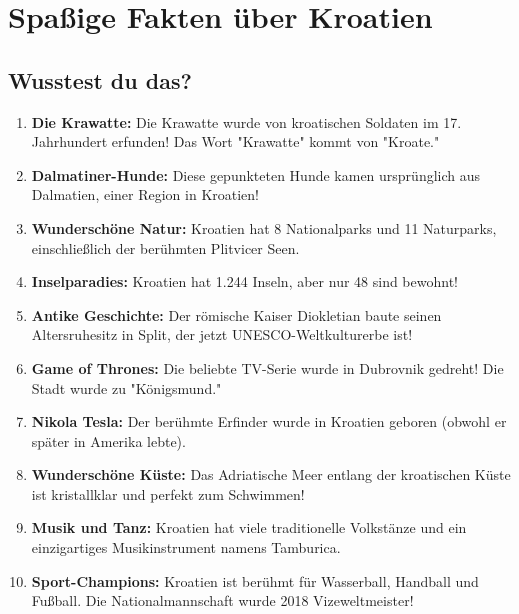 \section{Spaßige Fakten über Kroatien}

\begin{culture}
\subsection*{Wusstest du das?}

\begin{enumerate}
    \item \textbf{Die Krawatte:} Die Krawatte wurde von kroatischen Soldaten im 17. Jahrhundert erfunden! Das Wort "Krawatte" kommt von "Kroate."
    
    \item \textbf{Dalmatiner-Hunde:} Diese gepunkteten Hunde kamen ursprünglich aus Dalmatien, einer Region in Kroatien!
    
    \item \textbf{Wunderschöne Natur:} Kroatien hat 8 Nationalparks und 11 Naturparks, einschließlich der berühmten Plitvicer Seen.
    
    \item \textbf{Inselparadies:} Kroatien hat 1.244 Inseln, aber nur 48 sind bewohnt!
    
    \item \textbf{Antike Geschichte:} Der römische Kaiser Diokletian baute seinen Altersruhesitz in Split, der jetzt UNESCO-Weltkulturerbe ist!
    
    \item \textbf{Game of Thrones:} Die beliebte TV-Serie wurde in Dubrovnik gedreht! Die Stadt wurde zu "Königsmund."
    
    \item \textbf{Nikola Tesla:} Der berühmte Erfinder wurde in Kroatien geboren (obwohl er später in Amerika lebte).
    
    \item \textbf{Wunderschöne Küste:} Das Adriatische Meer entlang der kroatischen Küste ist kristallklar und perfekt zum Schwimmen!
    
    \item \textbf{Musik und Tanz:} Kroatien hat viele traditionelle Volkstänze und ein einzigartiges Musikinstrument namens Tamburica.
    
    \item \textbf{Sport-Champions:} Kroatien ist berühmt für Wasserball, Handball und Fußball. Die Nationalmannschaft wurde 2018 Vizeweltmeister!
\end{enumerate}


\end{culture}
